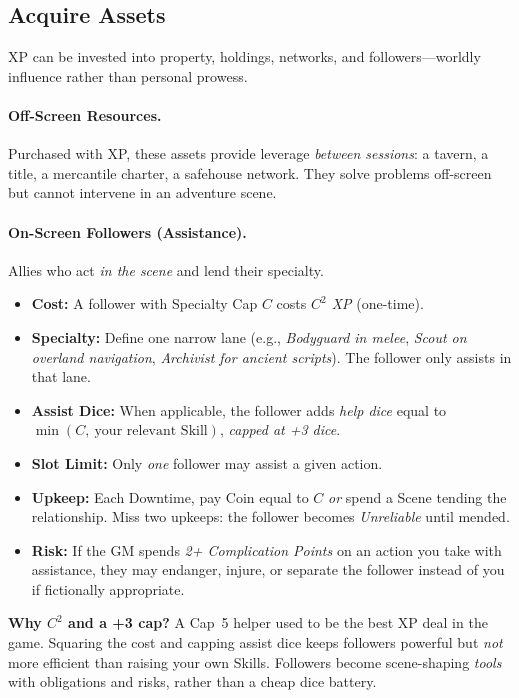 \documentclass[12pt]{article}
\begin{document}
\subsection{Acquire Assets}
XP can be invested into property, holdings, networks, and followers—worldly influence rather than personal prowess.

\paragraph{Off-Screen Resources.}
Purchased with XP, these assets provide leverage \emph{between sessions}: a tavern, a title, a mercantile charter, a safehouse network. They solve problems off-screen but cannot intervene in an adventure scene.

\paragraph{On-Screen Followers (Assistance).}
Allies who act \emph{in the scene} and lend their specialty.
\begin{itemize}
  \item \textbf{Cost:} A follower with Specialty Cap $C$ costs \emph{$C^2$ XP} (one-time).
  \item \textbf{Specialty:} Define one narrow lane (e.g., \emph{Bodyguard in melee}, \emph{Scout on overland navigation}, \emph{Archivist for ancient scripts}). The follower only assists in that lane.
  \item \textbf{Assist Dice:} When applicable, the follower adds \emph{help dice} equal to $\min(C,\ \text{your relevant Skill})$, \emph{capped at +3 dice}.
  \item \textbf{Slot Limit:} Only \emph{one} follower may assist a given action.
  \item \textbf{Upkeep:} Each Downtime, pay Coin equal to $C$ \emph{or} spend a Scene tending the relationship. Miss two upkeeps: the follower becomes \emph{Unreliable} until mended.
  \item \textbf{Risk:} If the GM spends \emph{2+ Complication Points} on an action you take with assistance, they may endanger, injure, or separate the follower instead of you if fictionally appropriate.
\end{itemize}

\begin{designnote}
\textbf{Why $C^2$ and a +3 cap?} A Cap~5 helper used to be the best XP deal in the game. Squaring the cost and capping assist dice keeps followers powerful but \emph{not} more efficient than raising your own Skills. Followers become scene-shaping \emph{tools} with obligations and risks, rather than a cheap dice battery.
\end{designnote}
\end{document}

